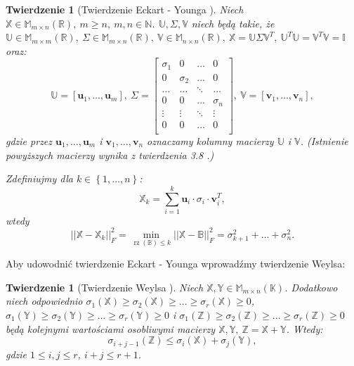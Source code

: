 \documentclass[12pt,a4paper]{report}
\newtheorem{tw}[df]{Twierdzenie}
\newcommand{\set}[1]{\left\lbrace {#1} \right\rbrace}
\newcommand{\setR}{\mathbb{R}}
\newcommand{\setK}{\mathbb{K}}
\newcommand{\setN}{\mathbb{N}}
\newcommand{\rz}[1]{\operatorname{rz}\left({#1} \right)}
\begin{document}
\begin{tw}[Twierdzenie Eckart - Younga {\citep{ulafiir}}]%
Niech $\mathbb{X} \in \mathbb{M}_{m \times n}(\setR),\: m \geq n, \:  m,n \in \setN$. $\mathbb{U}, \Sigma, \mathbb{V}$ niech będą takie, że $\mathbb{U} \in \mathbb{M}_{m \times m}(\setR), \: \Sigma \in \mathbb{M}_{m \times n}(\setR), \: \mathbb{V} \in \mathbb{M}_{n \times n}(\setR), \: \mathbb{X}=\mathbb{U}\Sigma \mathbb{V}^T, \: \mathbb{U}^T \mathbb{U} = \mathbb{V}^T \mathbb{V} =\mathbb{I}$ oraz:
$$
\mathbb{U} = [\mathbf{u}_1, \ldots, \mathbf{u}_m], \: \Sigma = \left[
        \begin{array}{cccc}
         \sigma_{1} & 0 & \ldots & 0 \\
         0 & \sigma_{2} & \ldots & 0 \\
         \ldots & \ldots& \ddots & \ldots \\
         0 & 0 & \ldots & \sigma_{n} \\
         \vdots & \vdots & \ddots & \vdots \\
         0 & 0 & \ldots & 0 \\
         \end{array}
      \right], \: \mathbb{V} = [\mathbf{v}_1, \ldots, \mathbf{v}_n],
$$
gdzie przez $\mathbf{u}_1, \ldots, \mathbf{u}_m$ i $\mathbf{v}_1, \ldots, \mathbf{v}_n$ oznaczamy kolumny macierzy $\mathbb{U}$ i $\mathbb{V}$. (Istnienie powyższych macierzy wynika z twierdzenia 3.8 .) 

Zdefiniujmy dla $k \in \set{1, \ldots, n}$:
$$
\mathbb{X}_k = \sum_{i=1}^k \mathbf{u}_i\cdot \sigma_{i} \cdot \mathbf{v}_i^T,
$$
wtedy
$$
||\mathbb{X} - \mathbb{X}_k||_F^2 = \min \limits_{\rz{\mathbb{B}} \leqslant k } ||\mathbb{X} - \mathbb{B}||_F^2 = \sigma_{k+1}^2 + ... + \sigma_{n}^2.
$$
\end{tw}

Aby udowodnić twierdzenie Eckart - Younga wprowadźmy twierdzenie Weylsa:

\begin{tw}[Twierdzenie Weylsa {\citep[Tw. 4.17]{tsvdalra}}]
Niech $\mathbb{X}, \mathbb{Y} \in \mathbb{M}_{m \times n}(\setK)$.
Dodatkowo niech odpowiednio $\sigma_1(\mathbb{X}) \geq \sigma_2(\mathbb{X})\geq \ldots \geq \sigma_r(\mathbb{X})\geq 0$, $\sigma_1(\mathbb{Y}) \geq \sigma_2(\mathbb{Y})\geq \ldots \geq \sigma_r(\mathbb{Y})\geq 0$ i $\sigma_1(\mathbb{Z}) \geq \sigma_2(\mathbb{Z})\geq \ldots \geq \sigma_r(\mathbb{Z})\geq 0$ będą kolejnymi wartościami osobliwymi macierzy $\mathbb{X}, \mathbb{Y}, \: \mathbb{Z}=\mathbb{X} + \mathbb{Y}$. Wtedy:
$$
\sigma_{i+j-1}(\mathbb{Z}) \leq \sigma_i(\mathbb{X}) + \sigma_j(\mathbb{Y}),
$$
gdzie $1 \leq i,j \leq r$, $i+j\leq r+1$.
\end{tw}
\end{document}
